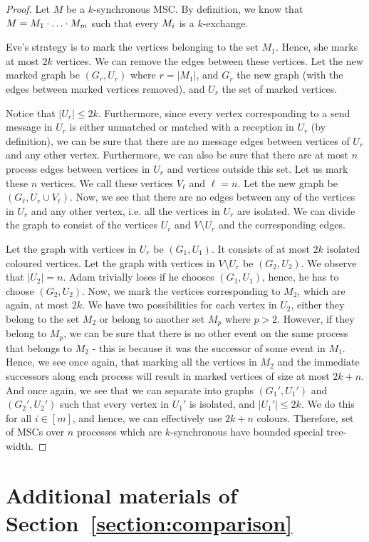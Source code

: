 \documentclass[a4paper,UKenglish,cleveref, autoref, thm-restate]{lipics-v2021}
\begin{document}
\begin{proof}
	Let $M$ be a $k$-synchronous MSC. By definition, we know that $M = M_1 \cdot \ldots \cdot M_m$
	such that every $M_i$ is a $k$-exchange.

	Eve's strategy is to mark the vertices belonging to the set $M_1$. Hence, she marks at most $2k$ vertices. We can remove the edges between these vertices. Let the new marked graph be $(G_r, U_r)$ where $r = |M_1|$, and $G_r$ the new graph (with the edges between marked vertices removed), and $U_r$ the set of marked vertices.

	Notice  that $|U_r| \leq 2k$. Furthermore, since every vertex corresponding to a send message in $U_r$ is either unmatched or matched with a reception in $U_r$ (by definition), we can be sure that there are no message edges between vertices of $U_r$ and any other vertex. Furthermore, we can also be sure that there are at most $n$ process edges between vertices in $U_r$ and vertices outside this set. Let us mark these $n$ vertices. We call these vertices $V_\ell$ and $\ell = n$. Let the new graph be $(G_\ell, U_r \cup V_\ell)$. Now, we see that there are no edges between any of the vertices in $U_r$ and any other vertex, i.e. all the vertices in $U_r$ are isolated. We can  divide the graph to consist of the vertices $U_r$ and $V \setminus U_r$ and the corresponding edges.

	Let the graph with vertices in $U_r$ be $(G_1, U_1)$. It consists of at most $2k$ isolated coloured vertices. Let the graph with vertices in $V \setminus U_r$ be $(G_2, U_2)$. We observe that $|U_2|=n$. Adam  trivially loses if he chooses $(G_1, U_1)$, hence, he has to choose $(G_2, U_2)$. Now, we mark the vertices corresponding to $M_2$, which are again, at most $2k$. We have two possibilities for each vertex in $U_2$, either they belong to the set $M_2$ or belong to another set $M_p$ where $p>2$. However, if they belong to $M_p$, we can be sure that there is no other event on the same process that belongs to $M_2$ - this is because it was the successor of some event in $M_1$. Hence, we see once again, that marking all the vertices in $M_2$ and the immediate successors along each process will result in marked vertices of size at most $2k + n$. And once again, we see that we can separate into graphs $(G_1', U_1')$ and $(G_2', U_2')$ such that every vertex in $U_1'$ is isolated, and $|U_1'| \leq 2k$. We do this for all $i \in [m]$, and hence, we can effectively use $2k +n$ colours. Therefore, set of MSCs over $n$ processes which are $k$-synchronous have bounded special tree-width.
\end{proof}

\section{Additional materials of Section~\ref{section:comparison}}\label{appendix:comparison}


\end{document}
